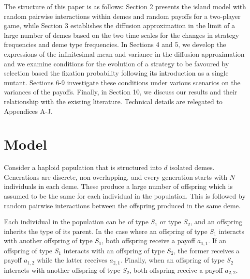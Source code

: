 \documentclass[11pt]{article}
\begin{document}
The structure of this paper is as follows: Section 2 presents the island model with random pairwise interactions within demes and random payoffs for a two-player game, while Section 3 establishes the diffusion approximation in the limit of a large number of demes based on the two time scales for the changes in strategy frequencies and deme type frequencies. In Sections 4 and 5, we develop the expressions of the infinitesimal mean and variance in the diffusion approximation and we examine conditions for the evolution of a strategy to be favoured by selection based the fixation probability following its introduction as a single mutant. Sections 6-9 investigate these conditions under various scenarios on the variances of the payoffs. Finally, in Section 10, we discuss our results and their relationship with the existing literature. Technical details are relegated to Appendices A-J. 


\section{Model}

Consider a haploid population that is structured into $d$ isolated demes. Generations are discrete, non-overlapping, and every generation starts with $N$ individuals in each deme. These produce a large number of offspring which is assumed to be the same for  each individual in the population.  This is followed by
random pairwise interactions between the offspring produced in the same deme. 

Each individual in the population can be of type $S_1$ or type $S_2$, and an offspring inherits the type of its parent. In the case where an offspring of type $S_1$ interacts with another offspring of type $S_1$, both offspring  receive a payoff  $a_{1,1}$. If an offspring  of type $S_1$ interacts with an offspring  of type $S_2$, the former receives a payoff $a_{1,2}$ while the latter receives $a_{2,1}$. Finally, when an offspring of type $S_2$ interacts with another offspring  of type $S_2$, both offspring  receive a payoff $a_{2,2}$.
\end{document}
